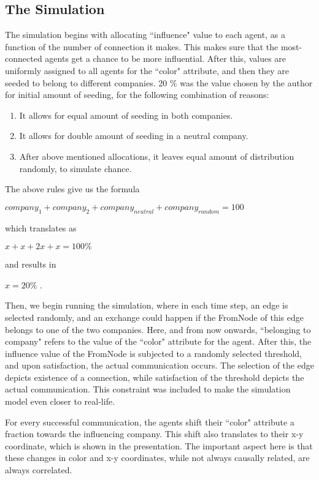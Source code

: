 \subsection{The Simulation} 
 
The simulation begins with allocating ``influence" value to each agent, as a function of the number of connection it makes. This makes sure that the most-connected agents get a chance to be more influential. 
After this, values are uniformly assigned to all agents for the ``color" attribute, and then they are seeded to belong to different companies. 20 \% was the value chosen by the author for initial amount of seeding, for the following combination of reasons:

\begin{enumerate}
\item It allows for equal amount of seeding in both companies.
\item It allows for double amount of seeding in a neutral company.
\item After above mentioned allocations, it leaves equal amount of distribution randomly, to simulate chance.
\end{enumerate}

The above rules give us the formula

$company_1 + company_2 + company_{neutral} + company_{random} = 100$

which translates as

$x + x + 2x + x = 100 \%$

and results in 

$x = 20 \%$ .

Then, we begin running the simulation, where in each time step, an edge is selected randomly, and an exchange could happen if the FromNode of this edge belongs to one of the two companies. Here, and from now onwards, ``belonging to company" refers to the value of the ``color" attribute for the agent.
After this, the influence value of the FromNode is subjected to a randomly selected threshold, and upon satisfaction, the actual communication occurs.
The selection of the edge depicts existence of a connection, while satisfaction of the threshold depicts the actual communication. This constraint was included to make the simulation model even closer to real-life.

For every successful communication, the agents shift their ``color" attribute a fraction towards the influencing company. This shift also translates to their x-y coordinate, which is shown in the presentation. The important aspect here is that these changes in color and x-y coordinates, while not always causally related, are always correlated. 

